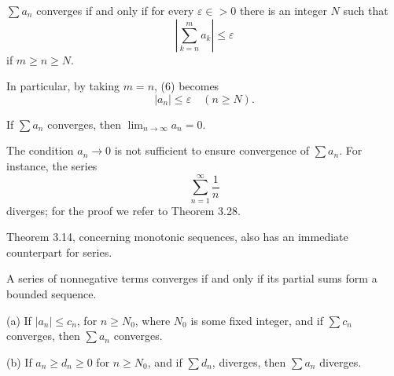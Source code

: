 \begin{thm}
    \label{thm:3.22}
    $\sum a_n$  converges if and only if for every $\varepsilon \in > 0$ there is an integer $N$ such that
    \begin{equation}
        \left|
            \sum_{k=n}^{m} a_k 
        \right| \leq \varepsilon
    \end{equation}
    if $m \geq n \geq N$. 
\end{thm}

In particular, by taking $m = n$, (6) becomes
\begin{equation*}
    |a_n| \leq \varepsilon \quad (n \geq N).
\end{equation*}

\begin{thm}
    \label{thm:3.23}
    If $\sum a_n$ converges, then $\lim_{n \rightarrow \infty} a_n = 0$. 
\end{thm}

The condition $a_n \rightarrow 0$ is not sufficient to ensure convergence of $\sum a_n$. For instance, the series
\begin{equation*}
    \sum_{n=1}^{\infty}\frac{1}{n}
\end{equation*}
diverges; for the proof we refer to Theorem 3.28.

Theorem 3.14, concerning monotonic sequences, also has an immediate
counterpart for series.
\begin{thm}
    \label{thm:3.24}
    A series of nonnegative terms converges if and only if its partial sums form a bounded sequence.
\end{thm}

\begin{thm}
    \label{thm:3.25}
    (a) If $|a_n| \leq c_n$, for $n \geq N_0$, where $N_0$ is some fixed integer, and if $\sum c_n$ converges, then $\sum a_n$ converges.

    (b) If $a_n \geq d_n \geq 0$ for $n \geq N_0$, and if $\sum d_n$, diverges, then $\sum a_n$ diverges.
\end{thm}